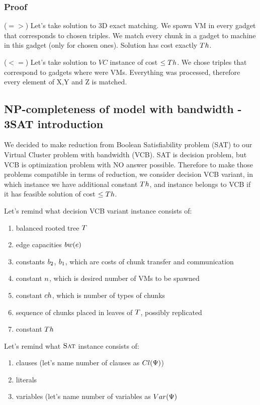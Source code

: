 \subsubsection{Proof} 

($=>$) Let's take solution to 3D exact matching. We spawn VM in every
gadget that corresponds to chosen triples. We match every chunk in a
gadget to machine in this gadget (only for chosen ones). Solution has
cost exactly $Th$.

($<=$) Let's take solution to $VC$ instance of cost $\leq Th$. We
chose triples that correspond to gadgets where were VMs. Everything
was processed, therefore every element of X,Y and Z is matched.
\subsection{NP-completeness of model with bandwidth -
 3SAT introduction}

We decided to make reduction from Boolean Satisfiability problem (SAT)
to our Virtual Cluster problem with bandwidth (VCB). SAT is decision
problem, but VCB is optimization problem with NO answer
possible. Therefore to make those problems compatible in terms of
reduction, we consider decision VCB variant, in which instance we have
additional constant $Th$, and instance belongs to VCB if it has feasible
solution of cost $\leq Th$.

Let's remind what decision VCB variant instance consists of:
\begin{enumerate}
\item balanced rooted tree $T$ 
\item edge capacities $bw(e)$
\item constants $b_2$, $b_1$, which are costs of chunk transfer and
communication
\item constant $n$, which is desired number of VMs to be spawned
\item constant $ch$, which is number of types of chunks
\item sequence of chunks placed in leaves of $T$, possibly replicated
\item constant $Th$
\end{enumerate}

Let's remind what $\textsc{Sat}$ instance consists of:
\begin{enumerate}
\item clauses (let's name number of clauses as $Cl(\Psi)$)
\item literals
\item variables (let's name number of variables as $Var(\Psi)$
\end{enumerate}

